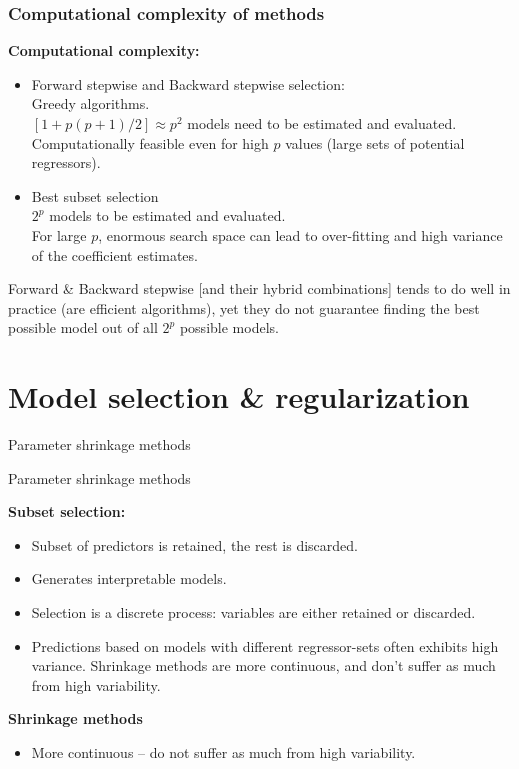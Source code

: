\documentclass{beamer}
\begin{document}
\begin{frame}
\frametitle{Computational complexity of methods}

\textbf{Computational complexity:} 
\bigskip
\begin{itemize}
  \item Forward stepwise and Backward stepwise selection:
        \\ Greedy algorithms.
        \\$[1+p(p+1)/2] \approx p^2$ models need to be estimated and evaluated.
        \\Computationally feasible even for high $p$ values (large sets of potential regressors).
        \vspace{0.5cm}
  \item Best subset selection
        \\ $2^p$ models to be estimated and evaluated.
        \\ For large $p$, enormous search space can lead to over-fitting and high variance of the coefficient estimates.
\end{itemize}
\bigskip
Forward \& Backward stepwise [and their hybrid combinations] tends to do well in practice (are efficient algorithms), yet they do not guarantee finding the best possible model out of all $2^p$ possible models.
\end{frame}

\section{Model selection \& regularization}
\begin{frame}{Parameter shrinkage methods}
\end{frame}
\begin{frame}{Parameter shrinkage methods}

\textbf{Subset selection:} 
\begin{itemize}
\item Subset of predictors is retained, the rest is discarded.
\item Generates interpretable models. 
\item Selection is a discrete process: variables are either retained or discarded. \item Predictions based on models with different regressor-sets often exhibits high variance. Shrinkage
methods are more continuous, and don’t suffer as much from high
variability.
\end{itemize}
\medskip
\textbf{Shrinkage methods} 
\begin{itemize}
    \item More continuous -- do not suffer as much from high variability.
\end{itemize}
\end{frame}
\end{document}
